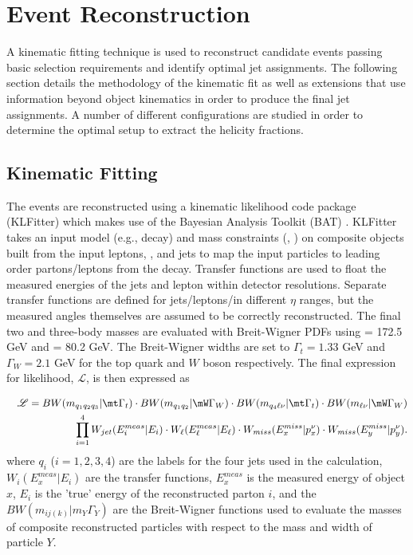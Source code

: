 \section{Event Reconstruction}
\label{sec:eventReconstruction}
A kinematic fitting technique is used to reconstruct candidate events passing basic selection requirements and identify optimal jet assignments. The following section details the methodology of the kinematic fit as well as extensions that use information beyond object kinematics in order to produce the final jet assignments. A number of different configurations are studied in order to determine the optimal setup to extract the helicity fractions.
\subsection{Kinematic Fitting} 
The events are reconstructed using a kinematic likelihood code package (KLFitter) \cite{klfitter} which makes use of the Bayesian Analysis Toolkit (BAT) \cite{Caldwell:2008fw}. KLFitter takes an input model (e.g., \ttbar decay) and mass constraints (\mt, \mW) on composite objects built from the input leptons, \met, and jets to map the input particles to leading order partons/leptons from the \ttbar decay. Transfer functions are used to float the measured energies of the jets and lepton within detector resolutions. Separate transfer functions are defined for jets/leptons/\met in different $\eta$ ranges, but the measured angles themselves are assumed to be correctly reconstructed. The final two and three-body masses are evaluated with Breit-Wigner PDFs using \mt = 172.5 GeV and \mW = 80.2 GeV. The Breit-Wigner widths are set to $\Gamma_t=1.33$ GeV and $\Gamma_W=2.1$ GeV for the top quark and $W$ boson respectively. The final expression for likelihood, $\mathscr{L}$, is then expressed as 

\begin{eqnarray}
&& \mathscr{L}=BW(m_{q_1q_2q_3}| \mt\Gamma_{t})\cdot BW(m_{q_1q_2}| \mW\Gamma_{W})\cdot BW(m_{q_4\ell\nu}| \mt\Gamma_{t})\cdot BW(m_{\ell\nu} | \mW\Gamma_{W}) \nonumber \\
&& \prod\limits_{i=1}^4 W_{jet}(E_{i}^{meas}|E_{i})\cdot W_{\ell}(E_{\ell}^{meas}|E_{\ell})\cdot W_{miss}(E_{x}^{miss}|p_{x}^{\nu})\cdot W_{miss}(E_{y}^{miss}|p_{y}^{\nu}) .
\label{eq:KLF}
\end{eqnarray}
where $q_i$ ($i=1,2,3,4$) are the labels for the four jets used in the calculation, $W_{i}(E_{x}^{meas}|E_{i})$ are the transfer functions, $E_{x}^{meas}$ is the measured energy of object $x$, $E_{i}$ is the 'true' energy of the reconstructed parton $i$, and the $BW(m_{ij(k)}| m_{Y}\Gamma_{Y})$ are the Breit-Wigner functions used to evaluate the masses of composite reconstructed particles with respect to the mass and width of particle $Y$. 

